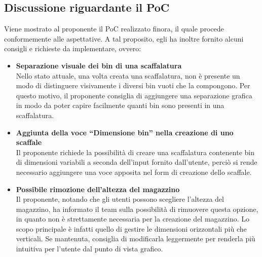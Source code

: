 \subsection{Discussione riguardante il PoC} \label{sec:argomenti:discussione_poc}
Viene mostrato al proponente il PoC realizzato finora, il quale procede conformemente alle aspettative. 
A tal proposito, egli ha inoltre fornito alcuni consigli e richieste da implementare, ovvero:
\begin{itemize}
    \item \textbf{Separazione visuale dei bin di una scaffalatura}\\
    Nello stato attuale, una volta creata una scaffalatura, non è presente un modo di distinguere visivamente i diversi bin vuoti che la compongono. Per questo motivo, il proponente consiglia di aggiungere una separazione grafica in modo da poter capire facilmente quanti bin sono presenti in una scaffalatura.
    \item \textbf{Aggiunta della voce ``Dimensione bin'' nella creazione di uno scaffale}\\
    Il proponente richiede la possibilità di creare una scaffalatura contenente bin di dimensioni variabili a seconda dell'input fornito dall'utente, perciò si rende necessario aggiungere una voce apposita nel form di creazione dello scaffale.
    \item \textbf{Possibile rimozione dell'altezza del magazzino}\\
    Il proponente, notando che gli utenti possono scegliere l'altezza del magazzino, ha informato il team sulla possibilità di rimuovere questa opzione, in quanto non è strettamente necessaria per la creazione del magazzino. Lo scopo principale è infatti quello di gestire le dimensioni orizzontali più che verticali. Se mantenuta, consiglia di modificarla leggermente per renderla più intuitiva per l'utente dal punto di vista grafico.
\end{itemize}

